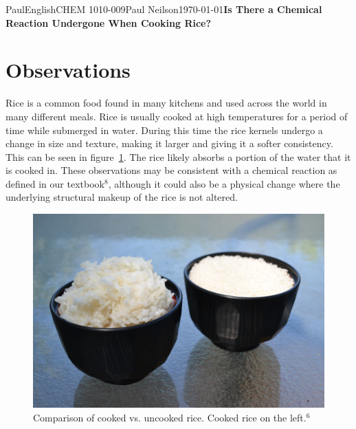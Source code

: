 \documentclass[10pt,twocolumn]{article}
\begin{document}
\begin{mla}{Paul}{English}{CHEM 1010-009}{Paul Neilson}{\today}{\textbf{Is There a Chemical Reaction Undergone When  Cooking Rice?}}




\section*{Observations}

Rice is a common food found in many kitchens and used across the world in many different meals. Rice is usually cooked at high temperatures for a period of time while submerged in water. During this time the rice kernels undergo a change in size and texture, making it larger and giving it a softer consistency. This can be seen in figure~\ref{fig:cooked_uncooked_rice}. The rice likely absorbs a portion of the water that it is cooked in. These observations may be consistent with a chemical reaction as defined in our textbook$^{8}$, although it could also be a physical change where the underlying structural makeup of the rice is not altered. 

\begin{figure}[h]
\centering
\includegraphics[width=\linewidth]{6740181017_5caf082268_o.jpg}
\caption{Comparison of cooked vs. uncooked rice. Cooked rice on the left.$^{6}$}
\label{fig:cooked_uncooked_rice}
\end{figure}



\end{mla}
\end{document}
